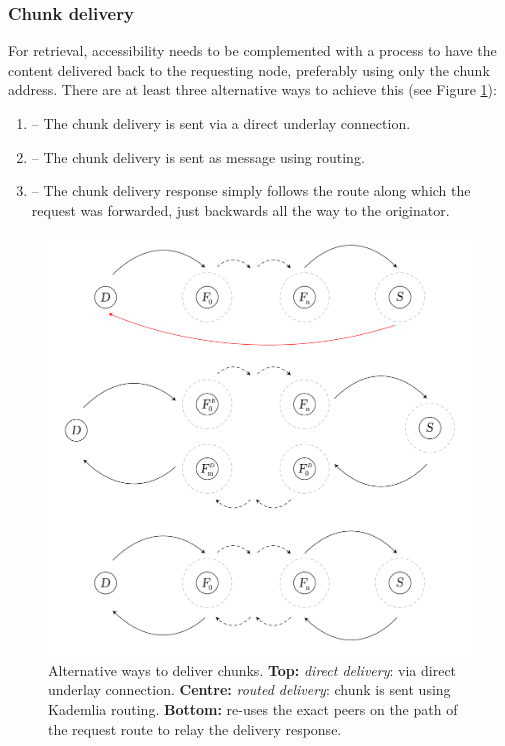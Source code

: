 \subsubsection{Chunk delivery}

For retrieval, accessibility needs to be complemented with a process to have the content delivered back to the requesting node, preferably using only the chunk address. There are at least three alternative ways to achieve this (see Figure \ref{fig:chunk-delivery}):

\begin{enumerate}
    \item {} -- The chunk delivery is sent via a direct underlay connection. 
    \item {} -- The chunk delivery is sent as message using routing.
    \item {} -- The chunk delivery response simply follows the route along which the request was forwarded, just backwards all the way to the originator.
\end{enumerate}


\begin{figure}[htbp]
   \centering
   \includegraphics[width=\textwidth]{fig/chunk-delivery.pdf}
   \caption[Alternative ways to deliver chunks: direct, routed and backward \statusgreen]{Alternative ways to deliver chunks. \textbf{Top:} \emph{direct delivery}: via direct underlay connection. \textbf{Centre:} \emph{routed delivery}: chunk is sent using Kademlia routing. \textbf{Bottom:}  re-uses the exact peers on the path of the request route to relay the delivery response.}
   \label{fig:chunk-delivery}
\end{figure}

